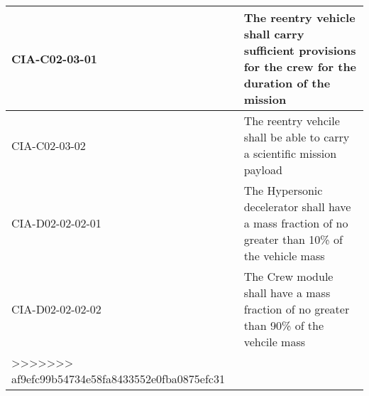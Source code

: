 \begin{table}[H]
\begin{tabular}{|p{}|p{}|}
		CIA-C02-03-01 & The reentry vehicle shall carry sufficient provisions for the crew for the duration of the mission
		\\ \hline
		CIA-C02-03-02 & The reentry vehcile shall be able to carry a scientific mission payload								\\ \hline
		CIA-D02-02-02-01 & The Hypersonic decelerator shall have a mass fraction of no greater than 10\% of the vehicle mass  \\ \hline
		CIA-D02-02-02-02 & The Crew module shall have a mass fraction of no greater than 90\% of the vehcile mass \\ \hline
>>>>>>> af9efc99b54734e58fa8433552e0fba0875efc31
		
		\end{tabular}
    \label{tab:MissionCon}
\end{table}